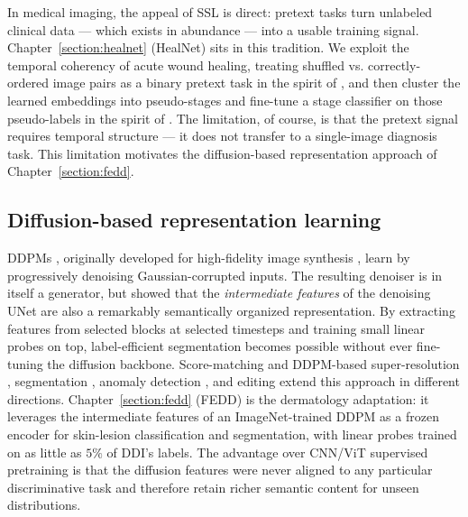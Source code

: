 \documentclass[11pt]{ucthesis}
\begin{document}
In medical imaging, the appeal of SSL is direct: pretext tasks turn unlabeled clinical data --- which exists in abundance --- into a usable training signal. Chapter~\ref{section:healnet} (HealNet) sits in this tradition. We exploit the temporal coherency of acute wound healing, treating shuffled vs. correctly-ordered image pairs as a binary pretext task in the spirit of \cite{misra2016shuffle,bromley1993signature}, and then cluster the learned embeddings into pseudo-stages and fine-tune a stage classifier on those pseudo-labels in the spirit of \cite{yan2020clusterfit}. The limitation, of course, is that the pretext signal requires temporal structure --- it does not transfer to a single-image diagnosis task. This limitation motivates the diffusion-based representation approach of Chapter~\ref{section:fedd}.

\subsection{Diffusion-based representation learning}

DDPMs \cite{Ho2020DenoisingDP,ho_2020_denoising}, originally developed for high-fidelity image synthesis \cite{dhariwal_2021_diffusion,jolicoeurmartineau_2020_adversarial,brock_2018_large}, learn by progressively denoising Gaussian-corrupted inputs. The resulting denoiser is in itself a generator, but \cite{baranchuk_2022_labelefficient} showed that the \emph{intermediate features} of the denoising UNet are also a remarkably semantically organized representation. By extracting features from selected blocks at selected timesteps and training small linear probes on top, label-efficient segmentation becomes possible without ever fine-tuning the diffusion backbone. Score-matching \cite{song_2021_scorebased,song_2020_improved} and DDPM-based super-resolution \cite{saharia_2022_image,li_2022_srdiff}, segmentation \cite{amit_2022_segdiff,wu_2023_medsegdiff,wu_2023_medsegdiffv2}, anomaly detection \cite{wolleb_2022_diffusion}, and editing \cite{meng_2022_sdedit} extend this approach in different directions. Chapter~\ref{section:fedd} (FEDD) is the dermatology adaptation: it leverages the intermediate features of an ImageNet-trained DDPM as a frozen encoder for skin-lesion classification and segmentation, with linear probes trained on as little as $5\%$ of DDI's labels. The advantage over CNN/ViT supervised pretraining is that the diffusion features were never aligned to any particular discriminative task and therefore retain richer semantic content for unseen distributions.
\end{document}
